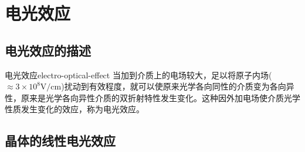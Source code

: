 \documentclass[cn,10pt,chinesefont=founder,math=mtpro2,cite=super,toc=onecol,twoside,openany]{elegantbook}
\begin{document}
\section{电光效应}

\subsection{电光效应的描述}

\begin{definition}{电光效应}{electro-optical-effect}
	当加到介质上的电场较大，足以将原子内场($\approx3\times10^8\mathrm{V/cm}$)扰动到有效程度，就可以使原来光学各向同性的介质变为各向异性，原来是光学各向异性介质的双折射特性发生变化。这种因外加电场使介质光学性质发生变化的效应，称为电光效应。
\end{definition}

\subsection{晶体的线性电光效应}
\end{document}
